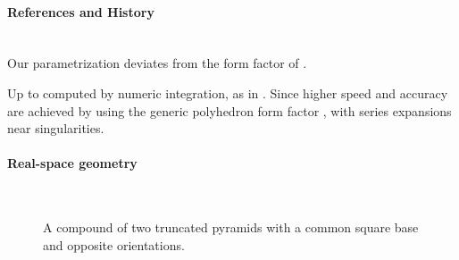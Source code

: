 \paragraph{References and History}\strut\\
Our parametrization deviates from the form factor  of \IsGISAXS
\cite[Eq.~2.32]{Laz08} \cite[Eq.~222]{ReLL09}.

Up to  computed by numeric integration, as in \IsGISAXS.
Since  higher speed and accuracy are achieved
by using the generic polyhedron form factor \cite{ba:ffp},
with series expansions near singularities.

 \label{SCuboctahedron}

\paragraph{Real-space geometry}\strut\\

\begin{figure}[H]
\hfill
{}
\hfill
{}
\hfill
{}
\hfill
\caption{A compound of two truncated pyramids with a common square base
and opposite orientations.}
\end{figure}

